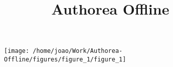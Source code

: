 






\title{Authorea Offline}
\begin{abstract}\end{abstract}





\begin{figure}[]
\begin{center}
\texttt{[image: /home/joao/Work/Authorea-Offline/figures/figure\_1/figure\_1]}
\caption{ \protect}
\end{center}
\end{figure}


{}


